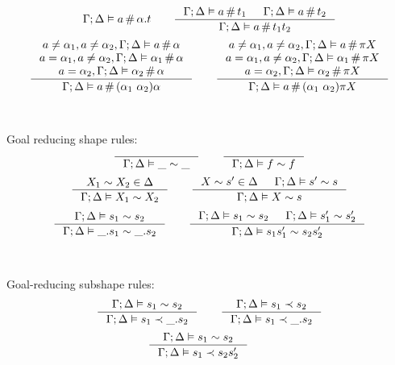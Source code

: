 \documentclass[english, mgr]{iithesis}
\begin{document}
\begin{appendices}
$${}{
  \cEnv ; \icEnv \vDash \atomv \cfresh \tbind{\atomexp}{\term}
}
\qquad
\inference{
  \cEnv ; \icEnv \vDash \atomv \cfresh \term_1 &
  \cEnv ; \icEnv \vDash \atomv \cfresh \term_2
}{
  \cEnv ; \icEnv \vDash \atomv \cfresh \term_1 \term_2
}
$$
$$
\inference{
  \atomv \cneq \atomexp_1, \atomv \cneq \atomexp_2, \cEnv ; \icEnv \vDash \atomv     \cfresh \atomexp \\
  \atomv \ceq  \atomexp_1, \atomv \cneq \atomexp_2, \cEnv ; \icEnv \vDash \atomexp_1 \cfresh \atomexp \\
                          \atomv \ceq  \atomexp_2 , \cEnv ; \icEnv \vDash \atomexp_2 \cfresh \atomexp
}{
  \cEnv ; \icEnv \vDash \atomv \cfresh \swap{\atomexp_1}{\atomexp_2} \atomexp
}
\qquad
\inference{
  \atomv \cneq \atomexp_1, \atomv \cneq \atomexp_2, \cEnv ; \icEnv \vDash \atomv     \cfresh \pi \termv \\
  \atomv \ceq  \atomexp_1, \atomv \cneq \atomexp_2, \cEnv ; \icEnv \vDash \atomexp_1 \cfresh \pi \termv \\
                          \atomv \ceq  \atomexp_2 , \cEnv ; \icEnv \vDash \atomexp_2 \cfresh \pi \termv
}{
  \cEnv ; \icEnv \vDash \atomv \cfresh \permswap{\atomexp_1}{\atomexp_2}{\pi} \termv
}
$$
\\
\\
Goal reducing shape rules:
$$
\inference{
}{
  \cEnv ; \icEnv \vDash \shatom \csheq \shatom
}
\qquad
\inference{
}{
  \cEnv ; \icEnv \vDash \symb \csheq \symb
}
$$
$$
\inference{
  \termv_1 \csheq \termv_2 \in \icEnv
}{
  \cEnv ; \icEnv \vDash \termv_1 \csheq \termv_2
}
\qquad
\inference{
  \termv  \csheq \shape' \in \icEnv &
  \cEnv ; \icEnv \vDash \shape'  \csheq \shape
}{
  \cEnv ; \icEnv \vDash \termv  \csheq \shape
}
$$
$$\inference{
  \cEnv ; \icEnv \vDash \shape_1 \csheq \shape_2
}{
  \cEnv ; \icEnv \vDash \shbind \shape_1 \csheq \shbind \shape_2
}
\qquad
\inference{
  \cEnv ; \icEnv \vDash \shape_1 \csheq \shape_2
  &
  \cEnv ; \icEnv \vDash \shape_1' \csheq \shape_2'
}{
  \cEnv ; \icEnv \vDash \shape_1 \shape_1' \csheq \shape_2 \shape_2'
}
$$
\\
\\
Goal-reducing subshape rules:
$$\inference{
  \cEnv ; \icEnv \vDash \shape_1 \csheq \shape_2
}{
  \cEnv ; \icEnv \vDash \shape_1 \cshlt \shbind \shape_2
}
\qquad
\inference{
  \cEnv ; \icEnv \vDash \shape_1 \cshlt \shape_2
}{
  \cEnv ; \icEnv \vDash \shape_1 \cshlt \shbind \shape_2
}
$$
$$\inference{
  \cEnv ; \icEnv \vDash \shape_1 \csheq \shape_2
}{
  \cEnv ; \icEnv \vDash \shape_1 \cshlt \shape_2 \shape_2'
}
\qquad
$$
\end{appendices}
\end{document}
